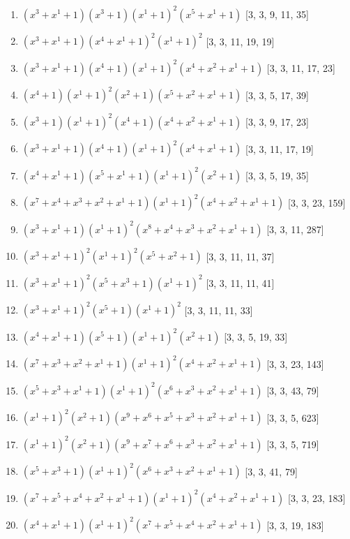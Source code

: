 \documentclass[10pt,twocolumn]{article}
\begin{document}
\begin{enumerate}
\item $(x^{3} + x^{1} + 1)(x^{3} + 1)(x^{1} + 1)^{2}(x^{5} + x^{1} + 1)$  [3, 3, 9, 11, 35]
\item $(x^{3} + x^{1} + 1)(x^{4} + x^{1} + 1)^{2}(x^{1} + 1)^{2}$  [3, 3, 11, 19, 19]
\item $(x^{3} + x^{1} + 1)(x^{4} + 1)(x^{1} + 1)^{2}(x^{4} + x^{2} + x^{1} + 1)$  [3, 3, 11, 17, 23]
\item $(x^{4} + 1)(x^{1} + 1)^{2}(x^{2} + 1)(x^{5} + x^{2} + x^{1} + 1)$  [3, 3, 5, 17, 39]
\item $(x^{3} + 1)(x^{1} + 1)^{2}(x^{4} + 1)(x^{4} + x^{2} + x^{1} + 1)$  [3, 3, 9, 17, 23]
\item $(x^{3} + x^{1} + 1)(x^{4} + 1)(x^{1} + 1)^{2}(x^{4} + x^{1} + 1)$  [3, 3, 11, 17, 19]
\item $(x^{4} + x^{1} + 1)(x^{5} + x^{1} + 1)(x^{1} + 1)^{2}(x^{2} + 1)$  [3, 3, 5, 19, 35]
\item $(x^{7} + x^{4} + x^{3} + x^{2} + x^{1} + 1)(x^{1} + 1)^{2}(x^{4} + x^{2} + x^{1} + 1)$  [3, 3, 23, 159]
\item $(x^{3} + x^{1} + 1)(x^{1} + 1)^{2}(x^{8} + x^{4} + x^{3} + x^{2} + x^{1} + 1)$  [3, 3, 11, 287]
\item $(x^{3} + x^{1} + 1)^{2}(x^{1} + 1)^{2}(x^{5} + x^{2} + 1)$  [3, 3, 11, 11, 37]
\item $(x^{3} + x^{1} + 1)^{2}(x^{5} + x^{3} + 1)(x^{1} + 1)^{2}$  [3, 3, 11, 11, 41]
\item $(x^{3} + x^{1} + 1)^{2}(x^{5} + 1)(x^{1} + 1)^{2}$  [3, 3, 11, 11, 33]
\item $(x^{4} + x^{1} + 1)(x^{5} + 1)(x^{1} + 1)^{2}(x^{2} + 1)$  [3, 3, 5, 19, 33]
\item $(x^{7} + x^{3} + x^{2} + x^{1} + 1)(x^{1} + 1)^{2}(x^{4} + x^{2} + x^{1} + 1)$  [3, 3, 23, 143]
\item $(x^{5} + x^{3} + x^{1} + 1)(x^{1} + 1)^{2}(x^{6} + x^{3} + x^{2} + x^{1} + 1)$  [3, 3, 43, 79]
\item $(x^{1} + 1)^{2}(x^{2} + 1)(x^{9} + x^{6} + x^{5} + x^{3} + x^{2} + x^{1} + 1)$  [3, 3, 5, 623]
\item $(x^{1} + 1)^{2}(x^{2} + 1)(x^{9} + x^{7} + x^{6} + x^{3} + x^{2} + x^{1} + 1)$  [3, 3, 5, 719]
\item $(x^{5} + x^{3} + 1)(x^{1} + 1)^{2}(x^{6} + x^{3} + x^{2} + x^{1} + 1)$  [3, 3, 41, 79]
\item $(x^{7} + x^{5} + x^{4} + x^{2} + x^{1} + 1)(x^{1} + 1)^{2}(x^{4} + x^{2} + x^{1} + 1)$  [3, 3, 23, 183]
\item $(x^{4} + x^{1} + 1)(x^{1} + 1)^{2}(x^{7} + x^{5} + x^{4} + x^{2} + x^{1} + 1)$  [3, 3, 19, 183]

\end{enumerate}
\end{document}
